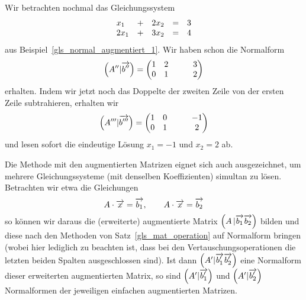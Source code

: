 \begin{beispiel}\label{gls_normal_augmentiert_2} 
Wir betrachten nochmal das Gleichungssystem
  	$$ \begin{array} {l c l c l}
   	x_1 & + & 2 x_2 & = & 3 \\
   	2 x_1 & + & 3 x_2 & = & 4
   	\end{array} $$
aus Beispiel~\ref{gls_normal_augmentiert_1}. Wir haben schon die Normalform 
  	$$  \left(A^{\prime \prime} \vert \overrightarrow{b^{\prime \prime}}\right) = 
     	\left( \begin{matrix} 1 & 2 & \quad & 3 \\ 0 & 1 & \quad & 2 
     	\end{matrix} \right) $$ 
erhalten. Indem wir jetzt noch das Doppelte der zweiten Zeile von der ersten Zeile subtrahieren, erhalten wir
  	$$ \left(A^{\prime \prime \prime} \vert \overrightarrow{b^{\prime  \prime \prime}}\right) = 
     	\left( \begin{matrix} 1 & 0 & \quad & -1 \\ 0 & 1 & \quad & 2  \end{matrix} \right) $$
und lesen sofort die eindeutige Lösung $x_1 = -1$ und $x_2 = 2$ ab.
\end{beispiel}

\begin{notiz}\label{gls_augmentiert_simultan} Die Methode mit den augmentierten Matrizen eignet sich auch 
ausgezeichnet, um mehrere Gleichungssysteme (mit denselben Koeffizienten) simultan zu lösen. Betrachten 
wir etwa die Gleichungen
  	$$ A \cdot \overrightarrow{x} = \overrightarrow{b_1}, \qquad 
  	A \cdot \overrightarrow{x} = \overrightarrow{b_2} $$
so können wir daraus die (erweiterte) augmentierte Matrix
$\left(A \, \vert \overrightarrow{b_1} \overrightarrow{b_2} \right)$ bilden und diese nach den Methoden von 
Satz~\ref{gls_mat_operation} auf Normalform bringen (wobei hier lediglich zu beachten ist, dass bei den 
Vertauschungsoperationen die letzten beiden Spalten ausgeschlossen sind). Ist dann 
$\left(A' \vert \overrightarrow{b'_1} \overrightarrow{b'_2} \right)$ eine 
Normalform dieser erweiterten augmentierten Matrix, so sind $\left(A' \vert \overrightarrow{b'_1}\right)$ 
und $\left(A' \vert \overrightarrow{b'_2}\right)$ Normalformen der 
jeweiligen einfachen augmentierten Matrizen.
\end{notiz}
     
\medbreak

